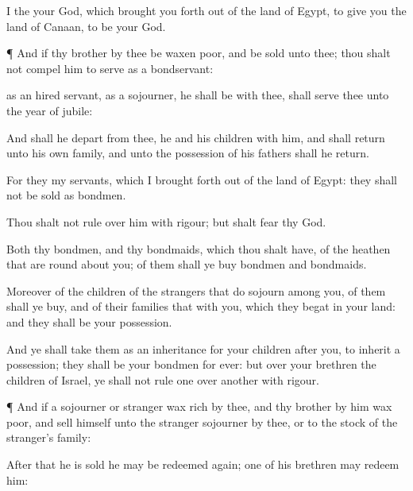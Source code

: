 {I
{} the
{} your
God, which brought you
forth out of the
land of
Egypt, to
give you the
land of
Canaan,
{} to be your
God.


\par }{\PP {}¶ And if thy
brother
{} by thee be waxen
poor, and be
sold unto thee; thou shalt not
compel him to
serve as a
bondservant:

 as an hired
servant,
{} as a
sojourner, he shall be with thee,
{} shall
serve thee unto the
year of
jubile:

And
{} shall he
depart from thee,
{} he and his
children with him, and shall
return unto his own
family, and unto the
possession of his
fathers shall he
return.

For they
{} my
servants, which I brought
forth out of the
land of
Egypt: they shall not be
sold
as
bondmen.

Thou shalt not
rule over him with
rigour; but shalt
fear thy
God.

Both thy
bondmen, and thy
bondmaids, which thou shalt have,
{} of the
heathen that are round
about you; of them shall ye
buy
bondmen and
bondmaids.

Moreover of the
children of the
strangers that do
sojourn among you, of them shall ye
buy, and of their
families that
{} with you, which they
begat in your
land: and they shall be your
possession.

And ye shall take them as an
inheritance for your
children
after you, to
inherit
{} a
possession; they shall be your
bondmen for
ever: but over your
brethren the
children of
Israel, ye shall not
rule
one over
another with
rigour.


\par }{\PP {}¶ And if a
sojourner or
stranger wax
rich by
thee, and thy
brother
{} by him wax
poor, and
sell himself unto the
stranger
{}
sojourner by thee, or to the
stock of the
stranger’s
family:

After that he is
sold he may be redeemed
again;
one of his
brethren may
redeem him:

}
